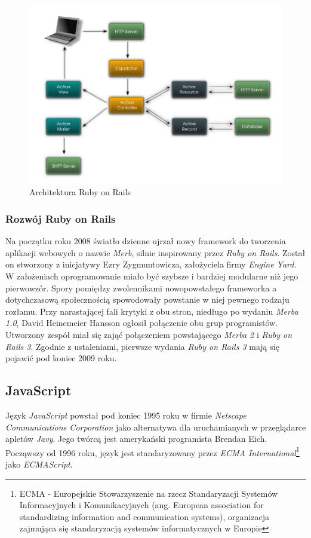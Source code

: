 \documentclass[a4paper,12pt]{article}
\begin{document}
\begin{figure}[ht]
  \begin{center}
    \includegraphics[width=\linewidth]{railsarchitecture.png}
  \end{center}
  \caption{Architektura Ruby on Rails}
  \label{railsarchitecture}
\end{figure}

\subsubsection{Rozwój Ruby on Rails}
Na początku roku 2008 światło dzienne ujrzał nowy framework do
tworzenia aplikacji webowych o nazwie \emph{Merb}, silnie inspirowany
przez \emph{Ruby on Rails}. Został on stworzony z inicjatywy Ezry
Zygmuntowicza, założyciela firmy \emph{Engine Yard}. W założeniach
oprogramowanie miało być szybsze i bardziej modularne niż jego
pierwowzór. Spory pomiędzy zwolennikami nowopowstałego frameworka a
dotychczasową społecznością spowodowały powstanie w niej pewnego
rodzaju rozłamu. Przy narastającej fali krytyki z obu stron, niedługo
po wydaniu \emph{Merba 1.0}, David Heinemeier Hansson ogłosił
połączenie obu grup programistów\cite{merge}. Utworzony zespół miał
się zająć połączeniem powstającego \emph{Merba 2} i \emph{Ruby on
  Rails 3}. Zgodnie z ustaleniami, pierwsze wydania \emph{Ruby on
  Rails 3} mają się pojawić pod koniec 2009 roku.

\subsection{JavaScript}
Język \emph{JavaScript} powstał pod koniec 1995 roku w firmie
\emph{Netscape Communications Corporation} jako alternatywa dla
uruchamianych w przeglądarce apletów \emph{Javy}. Jego twórcą jest
amerykański programista Brendan Eich. Począwszy od 1996 roku, język
jest standaryzowany przez \emph{ECMA International}\footnote{ECMA -
  Europejskie Stowarzyszenie na rzecz Standaryzacji Systemów
  Informacyjnych i Komunikacyjnych (ang. European association for
  standardizing information and communication systems), organizacja
  zajmująca się standaryzacją systemów informatycznych w Europie} jako
\emph{ECMAScript}.
\label{javascript}
\end{document}
